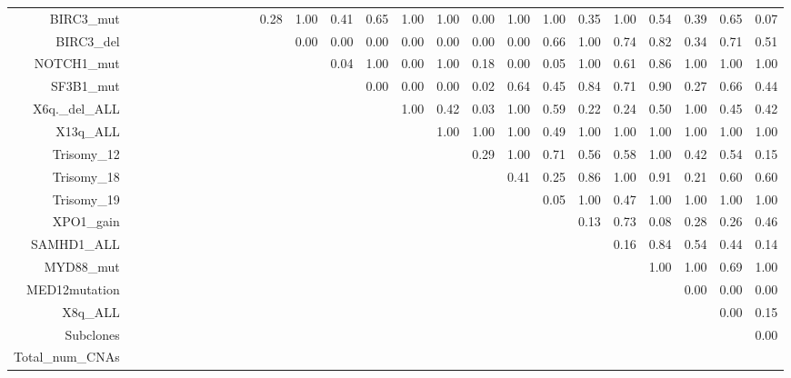 \documentclass[a4paper,11pt]{article}
\begin{document}
\begin{landscape}
\begin{table}[ht]
{{\begin{tabular}{|r|c|c|c|c|c|c|c|c|c|c|c|c|c|c|c|c|c|c|c|c|c|c|c|c|c|}
  BIRC3\_mut &  &  &  &  &  &  &  &  &  &  & 0.28 & 1.00 & 0.41 & 0.65 & 1.00 & 1.00 & 0.00 & 1.00 & 1.00 & 0.35 & 1.00 & 0.54 & 0.39 & 0.65 & 0.07 \\ 
  BIRC3\_del &  &  &  &  &  &  &  &  &  &  &  & 0.00 & 0.00 & 0.00 & 0.00 & 0.00 & 0.00 & 0.00 & 0.66 & 1.00 & 0.74 & 0.82 & 0.34 & 0.71 & 0.51 \\ 
  NOTCH1\_mut &  &  &  &  &  &  &  &  &  &  &  &  & 0.04 & 1.00 & 0.00 & 1.00 & 0.18 & 0.00 & 0.05 & 1.00 & 0.61 & 0.86 & 1.00 & 1.00 & 1.00 \\ 
  SF3B1\_mut &  &  &  &  &  &  &  &  &  &  &  &  &  & 0.00 & 0.00 & 0.00 & 0.02 & 0.64 & 0.45 & 0.84 & 0.71 & 0.90 & 0.27 & 0.66 & 0.44 \\ 
  X6q.\_del\_ALL &  &  &  &  &  &  &  &  &  &  &  &  &  &  & 1.00 & 0.42 & 0.03 & 1.00 & 0.59 & 0.22 & 0.24 & 0.50 & 1.00 & 0.45 & 0.42 \\ 
  X13q\_ALL &  &  &  &  &  &  &  &  &  &  &  &  &  &  &  & 1.00 & 1.00 & 1.00 & 0.49 & 1.00 & 1.00 & 1.00 & 1.00 & 1.00 & 1.00 \\ 
  Trisomy\_12 &  &  &  &  &  &  &  &  &  &  &  &  &  &  &  &  & 0.29 & 1.00 & 0.71 & 0.56 & 0.58 & 1.00 & 0.42 & 0.54 & 0.15 \\ 
  Trisomy\_18 &  &  &  &  &  &  &  &  &  &  &  &  &  &  &  &  &  & 0.41 & 0.25 & 0.86 & 1.00 & 0.91 & 0.21 & 0.60 & 0.60 \\ 
  Trisomy\_19 &  &  &  &  &  &  &  &  &  &  &  &  &  &  &  &  &  &  & 0.05 & 1.00 & 0.47 & 1.00 & 1.00 & 1.00 & 1.00 \\ 
  XPO1\_gain &  &  &  &  &  &  &  &  &  &  &  &  &  &  &  &  &  &  &  & 0.13 & 0.73 & 0.08 & 0.28 & 0.26 & 0.46 \\ 
  SAMHD1\_ALL &  &  &  &  &  &  &  &  &  &  &  &  &  &  &  &  &  &  &  &  & 0.16 & 0.84 & 0.54 & 0.44 & 0.14 \\ 
  MYD88\_mut &  &  &  &  &  &  &  &  &  &  &  &  &  &  &  &  &  &  &  &  &  & 1.00 & 1.00 & 0.69 & 1.00 \\ 
  MED12mutation &  &  &  &  &  &  &  &  &  &  &  &  &  &  &  &  &  &  &  &  &  &  & 0.00 & 0.00 & 0.00 \\ 
  X8q\_ALL &  &  &  &  &  &  &  &  &  &  &  &  &  &  &  &  &  &  &  &  &  &  &  & 0.00 & 0.15 \\ 
  Subclones &  &  &  &  &  &  &  &  &  &  &  &  &  &  &  &  &  &  &  &  &  &  &  &  & 0.00 \\ 
  Total\_num\_CNAs &  &  &  &  &  &  &  &  &  &  &  &  &  &  &  &  &  &  &  &  &  &  &  &  &  \\ 

\end{tabular}}}
\end{table}
\end{landscape}
\end{document}
